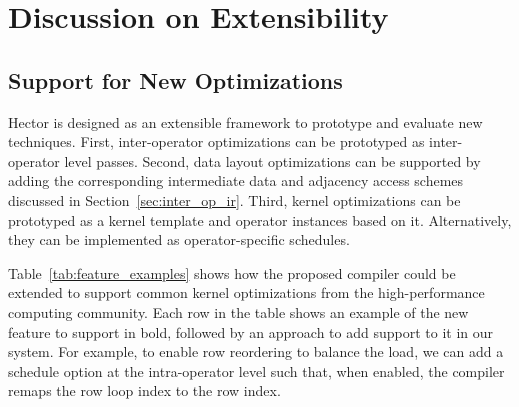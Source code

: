 \section{Discussion on Extensibility}\label{sec:future_work}

\subsection{Support for New Optimizations}
Hector is designed as an extensible framework to prototype and evaluate new techniques. First, inter-operator optimizations can be prototyped as inter-operator level passes. Second, data layout optimizations can be supported by adding the corresponding intermediate data and adjacency access schemes discussed in Section~\ref{sec:inter_op_ir}.
Third, kernel optimizations can be prototyped as a kernel template and operator instances based on it. Alternatively, they can be implemented as operator-specific schedules.

Table~\ref{tab:feature_examples} shows how the proposed compiler could be extended to support common kernel optimizations from the high-performance computing community. Each row in the table shows an example of the new feature to support in bold, followed by an approach to add support to it in our system. For example, to enable row reordering to balance the load, we can add a schedule option at the intra-operator level such that, when enabled, the compiler remaps the row loop index to the row index.




